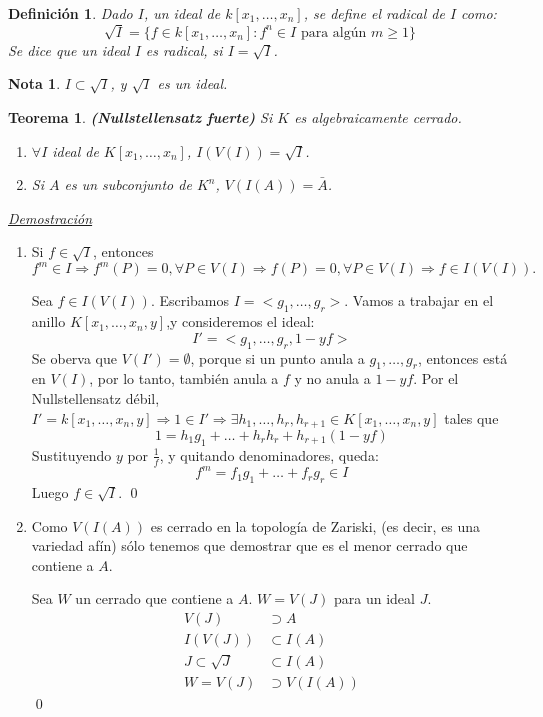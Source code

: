 \documentclass{article}
\newtheorem{teor}{Teorema}
\newtheorem{nota}{Nota}
\newtheorem{Def}{Definición}
\begin{document}
\begin{Def}
  Dado $I$, un ideal de $k[x_1,\dots, x_n]$, se define el radical de $I$ como:
  $$\sqrt{I}=\{ f \in k[x_1,\dots,x_n] : f^n \in I \text{ para algún } m\ge 1\}$$
  Se dice que un ideal $I$ es radical, si $I=\sqrt{I}$.
\end{Def}

\begin{nota}
  $I\subset \sqrt{I}$, y $\sqrt{I}$ es un ideal.
\end{nota}

\begin{teor}
  \textbf{(Nullstellensatz fuerte)} Si $K$ es algebraicamente cerrado.
  \begin{enumerate}
  \item $\forall I$ ideal de $K[x_1,\dots, x_n]$, $I(V(I))=\sqrt{I}$.
  \item Si $A$ es un subconjunto de $K^n$, $V(I(A))=\bar{A}$. 
  \end{enumerate}
\end{teor}

\textit{\underline{Demostración}}

\vspace{3mm}
\begin{enumerate}
\item \framebox{$\supseteq $} Si $f\in \sqrt{I}$, entonces $f^m\in I \Rightarrow f^m(P)=0, \forall P \in V(I) \Rightarrow f(P)=0, \forall P\in V(I) \Rightarrow f\in I(V(I)). $

\framebox{$\subseteq $} Sea $f\in I(V(I))$. Escribamos $I=<g_1,\dots,g_r>$. Vamos a trabajar en el anillo $K[x_1,\dots, x_n,y]$,y consideremos el ideal:
$$I'=<g_1,\dots,g_r,1-yf>$$
Se oberva que $V(I')=\emptyset$, porque si un punto anula a $g_1,\dots,g_r$, entonces está en $V(I)$, por lo tanto, también anula a $f$ y no anula a $1-yf$.
Por el Nullstellensatz débil, $I'=k[x_1,\dots,x_n,y] \Rightarrow 1\in I' \Rightarrow \exists h_1,\dots,h_r,h_{r+1}\in K[x_1,\dots,x_n,y]$ tales que
$$1=h_1g_1+\dots+h_rh_r+h_{r+1}(1-yf) $$
Sustituyendo $y$ por $\frac{1}{f}$, y quitando denominadores, queda:
$$f^m=f_1g_1+\dots+f_rg_r\in I$$
Luego $f\in \sqrt{I}$. \qed

\item Como $V(I(A))$ es cerrado en la topología de Zariski, (es decir, es una variedad afín) sólo tenemos que demostrar que es el menor cerrado que contiene a $A$. 

Sea $W$ un cerrado que contiene a $A$. $W=V(J)$ para un ideal $J$. 
\begin{equation}
  \begin{split}
    V(J)&\supset A \\
    I(V(J))&\subset I(A) \\
    J\subset \sqrt{J} &\subset I(A) \\
    W=V(J) &\supset V(I(A))
  \end{split}
\end{equation}
\qed
\end{enumerate}
\end{document}
